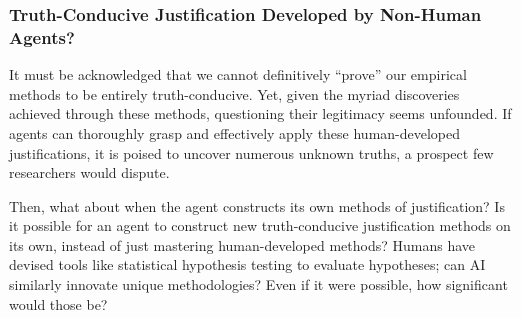 


\subsubsection{Truth-Conducive Justification Developed by Non-Human Agents?}


It must be acknowledged that we cannot definitively ``prove'' our empirical methods to be entirely truth-conducive. Yet, given the myriad discoveries achieved through these methods, questioning their legitimacy seems unfounded. If agents can thoroughly grasp and effectively apply these human-developed justifications, it is poised to uncover numerous unknown truths, a prospect few researchers would dispute.

Then, what about when the agent constructs its own methods of justification? Is it possible for an agent to construct new truth-conducive justification methods on its own, instead of just mastering human-developed methods? Humans have devised tools like statistical hypothesis testing to evaluate hypotheses; can AI similarly innovate unique methodologies? Even if it were possible, how significant would those be?

